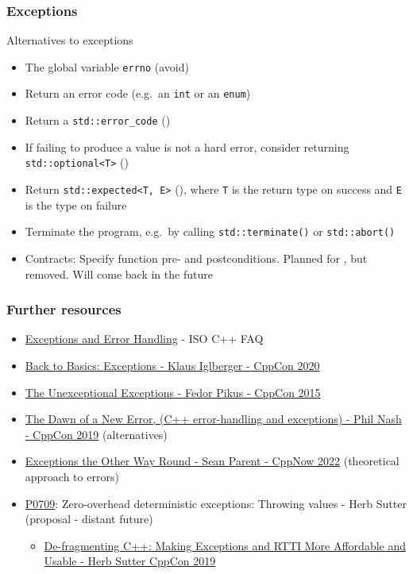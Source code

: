\begin{advanced}
\begin{frame}[fragile]
  \frametitle{Exceptions}
  \begin{block}{Alternatives to exceptions}
    \begin{itemize}
      \item The global variable \texttt{errno} (avoid)
      \item Return an error code (e.g.\ an \texttt{int} or an \texttt{enum})
      \item Return a \texttt{std::error_code} ()
      \item If failing to produce a value is not a hard error, consider returning \texttt{std::optional<T>} ()
      \item Return \texttt{std::expected<T, E>} (), where \texttt{T} is the return type on success and \texttt{E} is the type on failure
      \item Terminate the program, e.g.\ by calling \texttt{std::terminate()} or  \texttt{std::abort()}
      \item Contracts: Specify function pre- and postconditions. Planned for , but removed. Will come back in the future
    \end{itemize}
  \end{block}
\end{frame}

\begin{frame}[fragile]
  \frametitle{Further resources}
  \begin{block}{}
    \begin{itemize}
      \item \href{https://isocpp.org/wiki/faq/exceptions}{Exceptions and Error Handling} - ISO C++ FAQ
      \item \href{https://www.youtube.com/watch?v=0ojB8c0xUd8&t=1505s}{Back to Basics: Exceptions - Klaus Iglberger - CppCon 2020}
      \item \href{https://www.youtube.com/watch?v=fOV7I-nmVXw}{The Unexceptional Exceptions - Fedor Pikus - CppCon 2015}
      \item \href{https://www.youtube.com/watch?v=ZUH8p1EQswA}{The Dawn of a New Error, (C++ error-handling and exceptions) - Phil Nash - CppCon 2019} (alternatives)
      \item \href{https://www.youtube.com/watch?v=mkkaAWNE-Ig}{Exceptions the Other Way Round - Sean Parent - CppNow 2022} (theoretical approach to errors)
      \item \href{https://wg21.link/P0709}{P0709}: Zero-overhead deterministic exceptions: Throwing values - Herb Sutter (proposal - distant future)
      \begin{itemize}
        \item \href{https://www.youtube.com/watch?v=ARYP83yNAWk}{De-fragmenting C++: Making Exceptions and RTTI More Affordable and Usable - Herb Sutter CppCon 2019}
      \end{itemize}
    \end{itemize}
  \end{block}
\end{frame}
\end{advanced}
